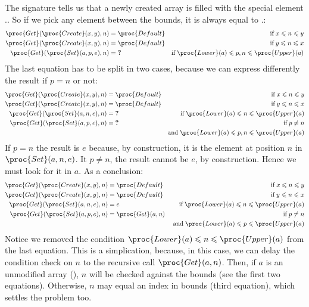 \begin{itemize}
  The signature tells us that a newly created array is filled with the
  special element .. So if we pick any
  element between the bounds, it is always equal to
  .:
  \begin{align*}
     \proc{Get} (\proc{Create} (x, y), n)
  &= \proc{Default}
  & \text{if} \; x \leqslant n \leqslant y\\
     \proc{Get} (\proc{Create} (x, y), n)
  &= \proc{Default}
  & \text{if} \; y \leqslant n \leqslant x\\
     \proc{Get} (\proc{Set} (a, p, e), n)
  &= \textbf{?}
  & \text{if} \;\proc{Lower} (a) \leqslant p, n \leqslant \proc{Upper} (a)
  \end{align*}
  The last equation has to be split in two cases, because we can
  express differently the result if \(p = n\) or not:
  \begin{align*}
     \proc{Get} (\proc{Create} (x, y), n)
  =& \;\proc{Default}
  & \text{if} \; x \leqslant n \leqslant y\\
     \proc{Get} (\proc{Create} (x, y), n)
  =& \;\proc{Default}
  & \text{if} \; y \leqslant n \leqslant x\\
     \proc{Get} (\proc{Set} (a, n, e), n)
  =& \;\textbf{?}
  & \text{if} \;\proc{Lower} (a) \leqslant n \leqslant \proc{Upper}
     (a)\\
     \proc{Get} (\proc{Set} (a, p, e), n)
  =& \;\textbf{?} &  \text{if} \; p \neq n\\
  && \text{and} \;\proc{Lower} (a) \leqslant p, n \leqslant \proc{Upper}
     (a)
  \end{align*}
  If \(p = n\) the result is \(e\) because, by construction, it is the
  element at position \(n\) in \(\proc{Set} (a, n, e)\). It \(p \neq
  n\), the result cannot be \(e\), by construction. Hence we must look
  for it in \(a\). As a conclusion:
  \begin{align*}
     \proc{Get} (\proc{Create} (x, y), n)
  =& \;\proc{Default}
  & \text{if} \; x \leqslant n \leqslant y\\
     \proc{Get} (\proc{Create} (x, y), n)
  =& \;\proc{Default}
  & \text{if} \; y \leqslant n \leqslant x\\
     \proc{Get} (\proc{Set} (a, n, e), n)
  =& \;e
  & \;\text{if} \;\proc{Lower} (a) \leqslant n \leqslant \proc{Upper}
     (a)\\
     \proc{Get} (\proc{Set} (a, p, e), n)
  =& \;\proc{Get} (a, n)
  &  \text{if} \; p \neq n\\
  && \;\text{and} \;\proc{Lower} (a) \leqslant p \leqslant \proc{Upper}
    (a)
  \end{align*}
Notice we removed the condition \(\proc{Lower} (a) \leqslant n
\leqslant \proc{Upper} (a)\) from the last equation. This is a
simplication, because, in this case, we can delay the condition check
on \(n\) to the recursive call \(\proc{Get} (a, n)\). Then, if \(a\)
is an unmodified array (), \(n\) will be checked against
the bounds (see the first two equations). Otherwise, \(n\) may equal
an index in bounds (third equation), which settles the problem too.

\end{itemize}
